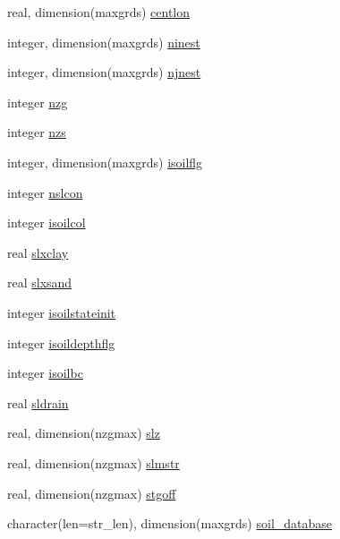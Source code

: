 \begin{DoxyCompactItemize}
real, dimension(maxgrds) \hyperlink{structename__coms_1_1ename__vars_a7506c4e39972312a97e0e77b815aa8c6}{centlon}
\item 
integer, dimension(maxgrds) \hyperlink{structename__coms_1_1ename__vars_ad107e5517683ea768aac8dfeee2b0b83}{ninest}
\item 
integer, dimension(maxgrds) \hyperlink{structename__coms_1_1ename__vars_a6b4ff0ee79e34eb06cdfb7a225c9f39b}{njnest}
\item 
integer \hyperlink{structename__coms_1_1ename__vars_aa0fb9c4b4747cac48b6ee79e91963c09}{nzg}
\item 
integer \hyperlink{structename__coms_1_1ename__vars_af650ba7e706e27ad6b66852cf1a79829}{nzs}
\item 
integer, dimension(maxgrds) \hyperlink{structename__coms_1_1ename__vars_a21dff8bdcd1ebb3170c9108bbc7cff0d}{isoilflg}
\item 
integer \hyperlink{structename__coms_1_1ename__vars_a1008680d504c847f8ff853514fa57e48}{nslcon}
\item 
integer \hyperlink{structename__coms_1_1ename__vars_a2c81e8a5830ea20e736843f7ba33c885}{isoilcol}
\item 
real \hyperlink{structename__coms_1_1ename__vars_aade69ff20bf0c14c294929031d608b5f}{slxclay}
\item 
real \hyperlink{structename__coms_1_1ename__vars_ac34a8405a0f8069fb33aa33f0a187d06}{slxsand}
\item 
integer \hyperlink{structename__coms_1_1ename__vars_a609c3cc8648b91e091d29c69f61e3e8c}{isoilstateinit}
\item 
integer \hyperlink{structename__coms_1_1ename__vars_a15a2756e69c304646aa12c0b02e671a3}{isoildepthflg}
\item 
integer \hyperlink{structename__coms_1_1ename__vars_affad1c641c88e3f3a7905fd2bde0ea38}{isoilbc}
\item 
real \hyperlink{structename__coms_1_1ename__vars_ad009cf792cd522fa579bc576db307ddd}{sldrain}
\item 
real, dimension(nzgmax) \hyperlink{structename__coms_1_1ename__vars_a3b7099ca72d93440f24669d68dfb909e}{slz}
\item 
real, dimension(nzgmax) \hyperlink{structename__coms_1_1ename__vars_a18ee0fb4760e960964daa43a73e059ee}{slmstr}
\item 
real, dimension(nzgmax) \hyperlink{structename__coms_1_1ename__vars_a34d52063c71c1b901390c225f8641619}{stgoff}
\item 
character(len=str\+\_\+len), dimension(maxgrds) \hyperlink{structename__coms_1_1ename__vars_aef86c476cff9cbcfe79082f1143233d6}{soil\+\_\+database}

\end{DoxyCompactItemize}
